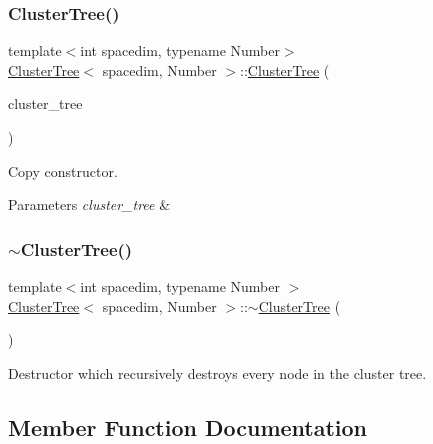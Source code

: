 \subsubsection{\texorpdfstring{Cluster\+Tree()}{ClusterTree()}\hspace{0.1cm}{\footnotesize\ttfamily [5/5]}}
{\footnotesize\ttfamily template$<$int spacedim, typename Number$>$ \\
\hyperlink{classClusterTree}{Cluster\+Tree}$<$ spacedim, Number $>$\+::\hyperlink{classClusterTree}{Cluster\+Tree} (\begin{DoxyParamCaption}\item[{const \hyperlink{classClusterTree}{Cluster\+Tree}$<$ spacedim, Number $>$ \&}]{cluster\+\_\+tree }\end{DoxyParamCaption})}

Copy constructor. 
\begin{DoxyParams}{Parameters}
{\em cluster\+\_\+tree} & \\
\hline
\end{DoxyParams}
\mbox{\label{classClusterTree_ad1b0ac0f6474de90d4fb528b6ed28db6}} 
\subsubsection{\texorpdfstring{$\sim$\+Cluster\+Tree()}{~ClusterTree()}}
{\footnotesize\ttfamily template$<$int spacedim, typename Number $>$ \\
\hyperlink{classClusterTree}{Cluster\+Tree}$<$ spacedim, Number $>$\+::$\sim$\hyperlink{classClusterTree}{Cluster\+Tree} (\begin{DoxyParamCaption}{ }\end{DoxyParamCaption})}

Destructor which recursively destroys every node in the cluster tree. 

\subsection{Member Function Documentation}
\mbox{\label{classClusterTree_a1e7dc037d01b3e15f1d6b4eacac59cb1}} 

